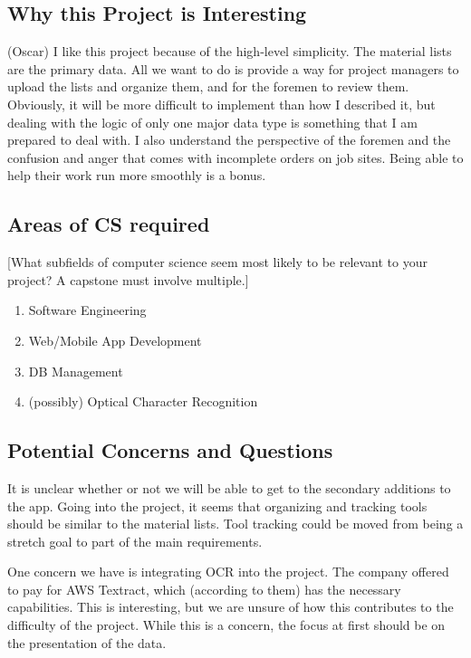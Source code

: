 \documentclass{article}
\begin{document}
\subsection{Why this Project is Interesting}
(Oscar) I like this project because of the high-level simplicity. The material lists are the primary data. All we want to do is provide a way for project managers to upload the lists and organize them, and for the foremen to review them. Obviously, it will be more difficult to implement than how I described it, but dealing with the logic of only one major data type is something that I am prepared to deal with. I also understand the perspective of the foremen and the confusion and anger that comes with incomplete orders on job sites. Being able to help their work run more smoothly is a bonus. 

\subsection{Areas of CS required}
[What subfields of computer science seem most likely to be relevant to your project? A capstone must involve multiple.]
\begin{enumerate}
    \item Software Engineering
    \item Web/Mobile App Development
    \item DB Management
    \item (possibly) Optical Character Recognition
\end{enumerate}

\subsection{Potential Concerns and Questions}
It is unclear whether or not we will be able to get to the secondary additions to the app. Going into the project, it seems that organizing and tracking tools should be similar to the material lists. Tool tracking could be moved from being a stretch goal to part of the main requirements. 
   
One concern we have is integrating OCR into the project. The company offered to pay for AWS Textract, which (according to them) has the necessary capabilities. This is interesting, but we are unsure of how this contributes to the difficulty of the project. While this is a concern, the focus at first should be on the presentation of the data. 
\end{document}
